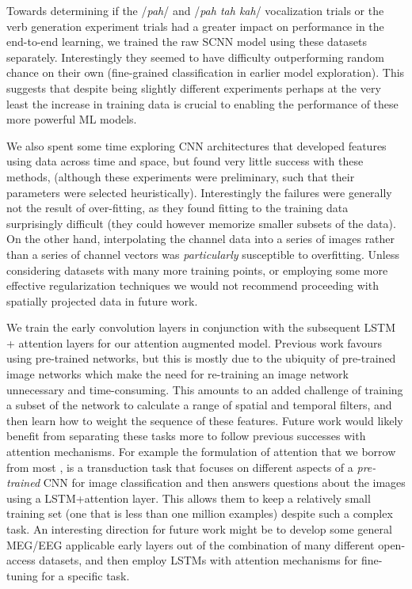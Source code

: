\documentclass[fleqn,10pt]{wlscirep}
\begin{document}
Towards determining if the /{\em pah}/ and /{\em pah tah kah}/ vocalization trials or the verb generation experiment trials had a greater impact on performance in the end-to-end learning, we trained the raw SCNN model using these datasets separately. Interestingly they seemed to have difficulty outperforming random chance on their own (fine-grained classification in earlier model exploration). This suggests that despite being slightly different experiments perhaps at the very least the increase in training data is crucial to enabling the performance of these more powerful ML models.

We also spent some time exploring CNN architectures that developed features using data across time and space, but found very little success with these methods, (although these experiments were preliminary, such that their parameters were selected heuristically). Interestingly the failures were generally not the result of over-fitting, as they found fitting to the training data surprisingly difficult (they could however memorize smaller subsets of the data). On the other hand, interpolating the channel data into a series of images rather than a series of channel vectors was {\em particularly} susceptible to overfitting. Unless considering datasets with many more training points, or employing some more effective regularization techniques we would not recommend proceeding with spatially projected data in future work. 

We train the early convolution layers in conjunction with the subsequent LSTM + attention layers for our attention augmented model. Previous work favours using pre-trained networks, but this is mostly due to the ubiquity of pre-trained image networks which make the need for re-training an image network unnecessary and time-consuming. This amounts to an added challenge of training a subset of the network to calculate a range of spatial and temporal filters, and then learn how to weight the sequence of these features. Future work would likely benefit from separating these tasks more to follow previous successes with attention mechanisms. For example the formulation of attention that we borrow from most \cite{Zhu}, is a transduction task that focuses on different aspects of a {\em pre-trained} CNN for image classification and then answers questions about the images using a LSTM+attention layer. This allows them to keep a relatively small training set (one that is less than one million examples) despite such a complex task. An interesting direction for future work might be to develop some general MEG/EEG applicable early layers out of the combination of many different open-access datasets, and then employ LSTMs with attention mechanisms for fine-tuning for a specific task.
\end{document}
